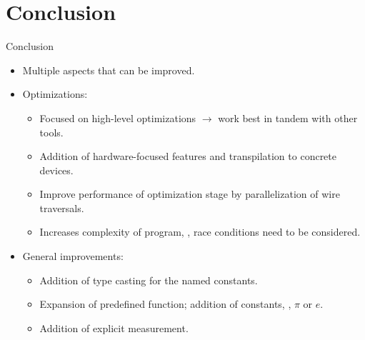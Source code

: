 
\section{Conclusion}
\begin{frame}{Conclusion}
    \begin{itemize}
        \item Multiple aspects that can be improved.
        \item Optimizations:
        \begin{itemize}
            \item Focused on high-level optimizations $\to$ work best in tandem with other tools.
            \item Addition of hardware-focused features and transpilation to concrete devices.
            \item Improve performance of optimization stage by parallelization of wire traversals.
            \item Increases complexity of program, \eg, race conditions need to be considered.
        \end{itemize}
        \item General improvements:
        \begin{itemize}
            \item Addition of type casting for the named constants.
            \item Expansion of predefined function; addition of constants, \eg, $\pi$ or $e$.
            \item Addition of explicit measurement. 
        \end{itemize}
    \end{itemize}
\end{frame}